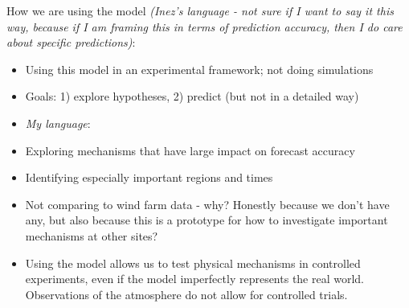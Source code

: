 \documentclass[12pt]{amsart}
\begin{document}
How we are using the model \textit{(Inez's language - not sure if I want to say it this way, because if I am framing this in terms of prediction accuracy, then I do care about specific predictions)}:
\begin{itemize}
\item Using this model in an experimental framework; not doing simulations
\item Goals: 1) explore hypotheses, 2) predict (but not in a detailed way)
\item \textit{My language}:
\item Exploring mechanisms that have large impact on forecast accuracy
\item Identifying especially important regions and times
\item Not comparing to wind farm data - why? Honestly because we don't have any, but also because this is a prototype for how to investigate important mechanisms at other sites?
\item Using the model allows us to test physical mechanisms in controlled experiments, even if the model imperfectly represents the real world.  Observations of the atmosphere do not allow for controlled trials.
\end{itemize}
\end{document}

